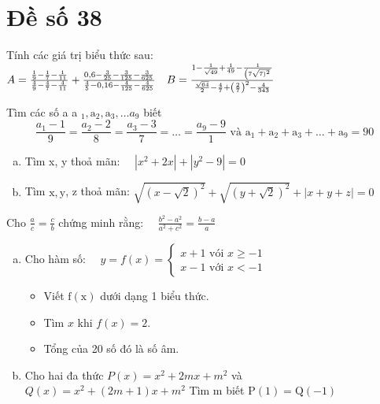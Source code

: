 \section{Đề số 38}

\begin{bt} 
	Tính các giá trị biểu thức sau:
	\\$A=\frac{\frac{1}{9}-\frac{1}{7}-\frac{1}{11}}{\frac{4}{9}-\frac{4}{7}-\frac{4}{11}}+\frac{0,6-\frac{3}{25}-\frac{3}{125}-\frac{3}{625}}{\frac{4}{5}-0,16-\frac{4}{125}-\frac{4}{625}} \quad
	 \hfill B=\frac{1-\frac{1}{\sqrt{49}}+\frac{1}{49}-\frac{1}{\left(7 \sqrt{7)^2}\right.}}{\frac{\sqrt{64}}{2}-\frac{4}{7}+\left(\frac{2}{7}\right)^2-\frac{4}{343}}$
	\loigiai{} 
\end{bt}

\begin{bt}
	Tìm các số a a $_1, \mathrm{a}_2, \mathrm{a}_3, \ldots a_9$  biết
	$$
	\frac{a_1-1}{9}=\frac{a_2-2}{8}=\frac{a_3-3}{7}=\ldots=\frac{a_9-9}{1} \text { và } \mathrm{a}_1+\mathrm{a}_2+\mathrm{a}_3+\ldots+\mathrm{a}_9=90
	$$
	\loigiai{} 
\end{bt}

\begin{bt}
	\hfill 
	\begin{enumerate}[a.]
		\item Tìm x, y thoả mãn: $\quad\left|x^2+2 x\right|+\left|y^2-9\right|=0$
		\item Tìm $\mathrm{x}, \mathrm{y}$, z thoả mãn: $\sqrt{(x-\sqrt{2})^2}+\sqrt{(y+\sqrt{2})^2}+|x+y+z|=0$
	\end{enumerate}
	\loigiai{} 
\end{bt}

\begin{bt} 
	Cho $\frac{a}{c}=\frac{c}{b}$ chứng minh rằng: $\quad \frac{b^2-a^2}{a^2+c^2}=\frac{b-a}{a}$
	\loigiai{}
\end{bt}



\begin{bt}
	\hfill
	\begin{enumerate}[a.]
	\item Cho hàm số: $\quad y=f(x)=\left\{\begin{array}{l}x+1 \text { vói } x \geq-1 \\ x-1 \text { với } x<-1\end{array}\right.$
	\begin{itemize}[-]
		\item Viết $\mathrm{f}(\mathrm{x})$ dưới dạng 1 biểu thức.
		\item Tìm $x$ khi $f(x)=2$.
		\item Tổng của 20 số đó là số âm.
	\end{itemize}
	\item Cho hai đa thức $P(x)=x^2+2 m x+m^2$ và $Q(x)=x^2+(2 m+1) x+m^2$ Tìm $\mathrm{m}$ biết $\mathrm{P}(1)=\mathrm{Q}(-1)$
	\end{enumerate}
	\loigiai{}
\end{bt}

